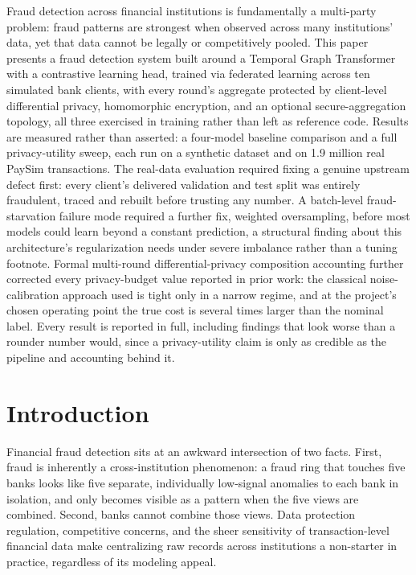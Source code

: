 \documentclass[12pt]{svproc}
\makeatletter
\renewenvironment{abstract}{%
  \list{}{\leftmargin\z@\rightmargin\z@\listparindent\z@\itemindent\listparindent}%
  \item[\hskip\labelsep\bfseries\abstractname]}
  {\endlist}
\makeatother
\begin{document}
\begin{abstract}
Fraud detection across financial institutions is fundamentally a
multi-party problem: fraud patterns are strongest when observed across
many institutions' data, yet that data cannot be legally or
competitively pooled. This paper presents a fraud detection system built
around a Temporal Graph Transformer with a contrastive learning head,
trained via federated learning across ten simulated bank clients, with
every round's aggregate protected by client-level differential privacy,
homomorphic encryption, and an optional secure-aggregation topology, all
three exercised in training rather than left as reference code. Results
are measured rather than asserted: a four-model baseline comparison and
a full privacy-utility sweep, each run on a synthetic dataset and on 1.9
million real PaySim transactions. The real-data evaluation required
fixing a genuine upstream defect first: every client's delivered
validation and test split was entirely fraudulent, traced and rebuilt
before trusting any number. A batch-level fraud-starvation failure mode
required a further fix, weighted oversampling, before most models could
learn beyond a constant prediction, a structural finding about this
architecture's regularization needs under severe imbalance rather than
a tuning footnote. Formal multi-round differential-privacy composition
accounting further corrected every privacy-budget value reported in
prior work: the classical noise-calibration approach used is tight only
in a narrow regime, and at the project's chosen operating point the
true cost is several times larger than the nominal label. Every result
is reported in full, including findings that look worse than a rounder
number would, since a privacy-utility claim is only as credible as the
pipeline and accounting behind it.
\end{abstract}

\section{Introduction}

Financial fraud detection sits at an awkward intersection of two facts.
First, fraud is inherently a cross-institution phenomenon: a fraud ring
that touches five banks looks like five separate, individually
low-signal anomalies to each bank in isolation, and only becomes visible
as a pattern when the five views are combined. Second, banks cannot
combine those views. Data protection regulation, competitive concerns,
and the sheer sensitivity of transaction-level financial data make
centralizing raw records across institutions a non-starter in practice,
regardless of its modeling appeal.
\end{document}

